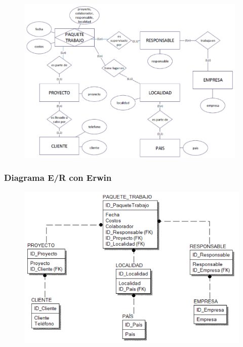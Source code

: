 \documentclass{article}
\begin{document}
	\begin{figure}[htb]
		\begin{center}
			\includegraphics[width=11cm]{./images/Ejercicio_3}
			
		\end{center}
	\end{figure}

\subsubsection{\textbf{Diagrama E/R con Erwin }}

	\begin{figure}[htb]
		\begin{center}
			\includegraphics[width=12cm]{./images/erwin_3}
			
		\end{center}
	\end{figure}

\newpage
\end{document}
